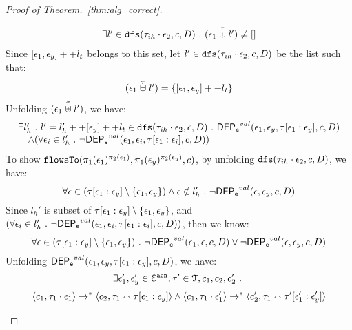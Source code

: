 \begin{proof}[Proof of Theorem.~\ref{thm:alg_correct}]
\begin{case}
\begin{subcase}
\begin{subsubcase}
%
\[
\begin{array}{l}
  \exists l' \in \mathtt{dfs}(\mathtt{\tau}_{ih}\cdot \mathtt{\epsilon}_2, c, D) ~.~
   (\mathtt{\epsilon}_1 \stackrel{\mathtt{\tau}}{\uplus} l') \neq []
\end{array}
\]
%
Since $[\mathtt{\epsilon}_1, \mathtt{\epsilon}_y] ++ l_t $ belongs to this set, let $l' \in \mathtt{dfs}(\mathtt{\tau}_{ih}\cdot \mathtt{\epsilon}_2, c, D)$ be the list such that:
\[
\begin{array}{l}
   (\mathtt{\epsilon}_1 \stackrel{\mathtt{\tau}}{\uplus} l') = \{[\mathtt{\epsilon}_1, \mathtt{\epsilon}_y] ++ l_t\}
\end{array}
\]
%
Unfolding $(\mathtt{\epsilon}_1 \stackrel{\mathtt{\tau}}{\uplus} l') $, we have:
\[
\begin{array}{l}
  \exists l_{h}' ~.~ l' = l_{h}' ++ [\mathtt{\epsilon}_y] ++ l_t \in \mathtt{dfs}(\mathtt{\tau}_{ih}\cdot \mathtt{\epsilon}_2, c, D) ~.~
  \mathsf{DEP_{\mathtt{e}}}^{val}(\mathtt{\epsilon}_1, \mathtt{\epsilon}_y, \mathtt{\tau}[\mathtt{\epsilon}_1:\mathtt{\epsilon}_y], c, D)
  \\ \quad \land 
  (\forall \mathtt{\epsilon}_i \in l_{h}' ~.~ \neg \mathsf{DEP_{\mathtt{e}}}^{val} (\mathtt{\epsilon}_1, \mathtt{\epsilon}_i, \mathtt{\tau}[\mathtt{\epsilon}_1: \mathtt{\epsilon}_i], c, D))
\end{array}
\]
%
%
To show $\mathtt{flowsTo}(\pi_1(\mathtt{\epsilon}_1)^{\pi_2(\mathtt{\epsilon}_1)}, \pi_1(\mathtt{\epsilon}_y)^{\pi_2(\mathtt{\epsilon}_y)}, c)$, 
%
by unfolding $\mathtt{dfs}(\mathtt{\tau}_{ih}\cdot \mathtt{\epsilon}_2, c, D) $, we have:
\[
  \forall \mathtt{\epsilon} \in (\mathtt{\tau}[\mathtt{\epsilon}_1:\mathtt{\epsilon}_y]\setminus \{\mathtt{\epsilon}_1, \mathtt{\epsilon}_y\}) 
 \land \mathtt{\epsilon} \notin l_h' 
 ~.~ 
 \neg \mathsf{DEP_{\mathtt{e}}}^{val} (\mathtt{\epsilon}, \mathtt{\epsilon}_y, c, D)
\]
%
Since $l_{h}'$ is subset of $\mathtt{\tau}[\mathtt{\epsilon}_1:\mathtt{\epsilon}_y] \setminus \{\mathtt{\epsilon}_1, \mathtt{\epsilon}_y\}$, and $(\forall \mathtt{\epsilon}_i \in l_{h}' ~.~ \neg \mathsf{DEP_{\mathtt{e}}}^{val} (\mathtt{\epsilon}_1, \mathtt{\epsilon}_i, \mathtt{\tau}[\mathtt{\epsilon}_1: \mathtt{\epsilon}_i], c, D))$,
then we know:
\[
  \forall \mathtt{\epsilon} \in (\mathtt{\tau}[\mathtt{\epsilon}_1:\mathtt{\epsilon}_y]\setminus \{\mathtt{\epsilon}_1, \mathtt{\epsilon}_y\}) ~.~
  \neg \mathsf{DEP_{\mathtt{e}}}^{val} (\mathtt{\epsilon}_1, \mathtt{\epsilon}, c, D) \lor \neg \mathsf{DEP_{\mathtt{e}}}^{val} (\mathtt{\epsilon}, \mathtt{\epsilon}_y, c, D)
\]
%
Unfolding $\mathsf{DEP_{\mathtt{e}}}^{val}(\mathtt{\epsilon}_1, \mathtt{\epsilon}_y, \mathtt{\tau}[\mathtt{\epsilon}_1:\mathtt{\epsilon}_y], c, D)$, we have:
\[
  \exists \mathtt{\epsilon}_1', \mathtt{\epsilon}_y' \in \mathcal{E}^{\mathtt{{asn}}},
  \mathtt{\tau}' \in \mathcal{T}, c_1, c_2, c_2' ~.~
\]
%
\[
\langle c_1, \mathtt{\tau}_1 \cdot \mathtt{\epsilon}_1 \rangle \rightarrow^{*} \langle c_2, \mathtt{\tau}_1 \smallfrown \mathtt{\tau}[\mathtt{\epsilon}_1:\mathtt{\epsilon}_y] \rangle 
\land
\langle c_1, \mathtt{\tau}_1 \cdot \mathtt{\epsilon}_1' \rangle \rightarrow^{*} \langle c_2', \mathtt{\tau}_1 \smallfrown \mathtt{\tau}'[\mathtt{\epsilon}_1':\mathtt{\epsilon}_y'] \rangle 
\]
\end{subsubcase}
\end{subcase}
\end{case}
\end{proof}
